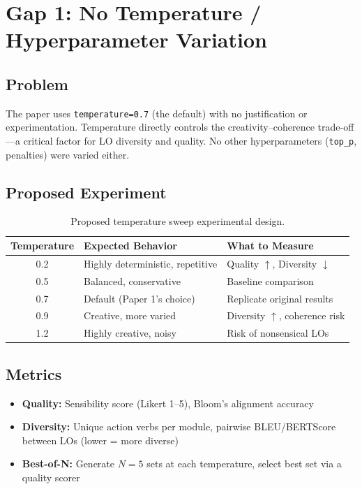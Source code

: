\documentclass[11pt,a4paper]{article}
\begin{document}
\section{Gap 1: No Temperature / Hyperparameter Variation}

\subsection{Problem}
The paper uses \texttt{temperature=0.7} (the default) with no justification or experimentation. Temperature directly controls the creativity--coherence trade-off---a critical factor for LO diversity and quality. No other hyperparameters (\texttt{top\_p}, penalties) were varied either.

\subsection{Proposed Experiment}

\begin{table}[H]
\centering
\caption{Proposed temperature sweep experimental design.}
\label{tab:temp}
\begin{tabular}{@{}clp{5.5cm}@{}}
\toprule
\textbf{Temperature} & \textbf{Expected Behavior} & \textbf{What to Measure} \\
\midrule
0.2 & Highly deterministic, repetitive & Quality $\uparrow$, Diversity $\downarrow$ \\
0.5 & Balanced, conservative & Baseline comparison \\
0.7 & Default (Paper 1's choice) & Replicate original results \\
0.9 & Creative, more varied & Diversity $\uparrow$, coherence risk \\
1.2 & Highly creative, noisy & Risk of nonsensical LOs \\
\bottomrule
\end{tabular}
\end{table}

\subsection{Metrics}
\begin{itemize}[nosep]
    \item \textbf{Quality:} Sensibility score (Likert 1--5), Bloom's alignment accuracy
    \item \textbf{Diversity:} Unique action verbs per module, pairwise BLEU/BERTScore between LOs (lower = more diverse)
    \item \textbf{Best-of-N:} Generate $N=5$ sets at each temperature, select best set via a quality scorer
\end{itemize}
\end{document}
